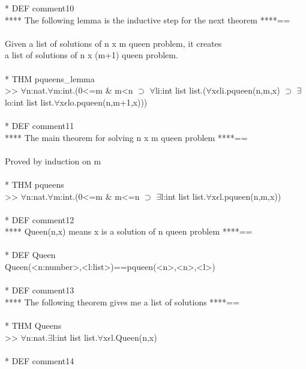 \N{}* DEF comment10 \\{}
\N{}      **** The following lemma is the inductive step for the next theorem ****== \\{}
\N{}       \\{}
\N{}      Given a list of solutions of n x m queen problem, it creates \\{}
\N{}      a list of solutions of n x (m+1) queen problem. \\{}
\N{} \\{}
\N{}* THM pqueens\_lemma \\{}
\N{}      >> \(\forall{}\)n:nat.\(\forall{}\)m:int.(0<=m \& m<n \(\supset{}\) \(\forall{}\)li:int list list.(\(\forall{}\)x\(\epsilon{}\)li.pqueen(n,m,x) \(\supset{}\) \(\exists{}\)lo:int list list.\(\forall{}\)x\(\epsilon{}\)lo.pqueen(n,m+1,x))) \\{}
\N{} \\{}
\N{}* DEF comment11 \\{}
\N{}      **** The main theorem for solving n x m queen problem ****== \\{}
\N{}       \\{}
\N{}      Proved by induction on m \\{}
\N{} \\{}
\N{}* THM pqueens \\{}
\N{}      >> \(\forall{}\)n:nat.\(\forall{}\)m:int.(0<=m \& m<=n \(\supset{}\) \(\exists{}\)l:int list list.\(\forall{}\)x\(\epsilon{}\)l.pqueen(n,m,x)) \\{}
\N{} \\{}
\N{}* DEF comment12 \\{}
\N{}      **** Queen(n,x) means x is a solution of n queen problem ****== \\{}
\N{} \\{}
\N{}* DEF Queen \\{}
\N{}      Queen(<n:number>,<l:list>)==pqueen(<n>,<n>,<l>) \\{}
\N{} \\{}
\N{}* DEF comment13 \\{}
\N{}      **** The following theorem gives me a list of solutions ****== \\{}
\N{} \\{}
\N{}* THM Queens \\{}
\N{}      >> \(\forall{}\)n:nat.\(\exists{}\)l:int list list.\(\forall{}\)x\(\epsilon{}\)l.Queen(n,x) \\{}
\N{} \\{}
\N{}* DEF comment14 \\{}
